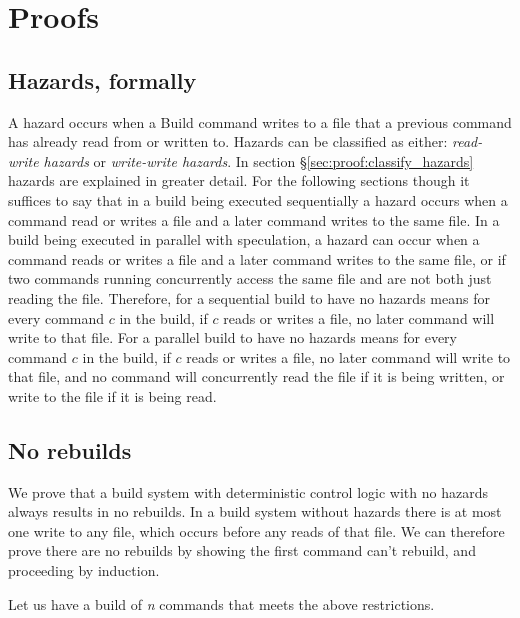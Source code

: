 \section{Proofs}
\label{sec:proof}

\subsection{Hazards, formally}

A hazard occurs when a Build command writes to a file that a previous command has already read from or written to.  Hazards can be classified as either: \emph{read-write hazards} or \emph{write-write hazards}.  In section \S\ref{sec:proof:classify_hazards} hazards are explained in greater detail.  For the following sections though it suffices to say that in a build being executed sequentially a
hazard occurs when a command read or writes a file and a later command writes to the same file.  In a build being executed in parallel with speculation, a hazard can occur when a command reads or writes a file and a later command writes to the same file, or if two commands running concurrently access the same file and are not both just reading the file.  Therefore, for a sequential \Rattle build to have no hazards means for every command $c$ in the build, if $c$ reads or writes a file, no later command will write to that file.  For a parallel \Rattle build to have no hazards means for every command $c$ in the build, if $c$ reads or writes a file, no later command will write to that file, and no command will concurrently read the file if it is being written, or write to the file if it is being read.


\subsection{No rebuilds}
\label{sec:proof:no_rebuild}

We prove that a build system with deterministic control logic with no hazards always results in no rebuilds.
In a build system without hazards there is at most one write to any file, which occurs before any reads of that file. We can therefore prove there are no rebuilds by showing the first command can't rebuild, and proceeding by induction.

Let us have a build of \emph{n} commands that meets the above restrictions.  

